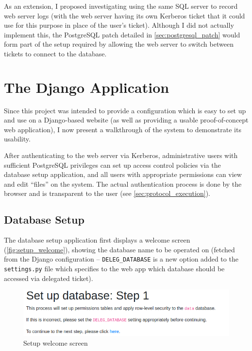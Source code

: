 \documentclass[12pt]{report}
\begin{document}
As an extension, I proposed investigating using the same SQL server to record web server logs (with the web server having its own Kerberos ticket that it could use for this purpose in place of the user's ticket). Although I did not actually implement this, the PostgreSQL patch detailed in \autoref{sec:postgresql_patch} would form part of the setup required by allowing the web server to switch between tickets to connect to the database.

\section{The Django Application}
Since this project was intended to provide a configuration which is easy to set up and use on a Django-based website (as well as providing a usable proof-of-concept web application), I now present a walkthrough of the system to demonstrate its usability.

After authenticating to the web server via Kerberos, administrative users with sufficient PostgreSQL privileges can set up access control policies via the database setup application, and all users with appropriate permissions can view and edit ``files'' on the system. The actual authentication process is done by the browser and is transparent to the user (see \autoref{sec:protocol_execution}).

\subsection{Database Setup}
The database setup application first displays a welcome screen (\autoref{fig:setup_welcome}), showing the database name to be operated on (fetched from the Django configuration -- \verb+DELEG_DATABASE+ is a new option added to the \verb+settings.py+ file which specifies to the web app which database should be accessed via delegated ticket).

\begin{figure}[ht]
  \begin{center}
    \includegraphics[scale=0.5]{02-setup1.png}
  \end{center}
  \caption{Setup welcome screen}
  \label{fig:setup_welcome}
\end{figure}
\end{document}
